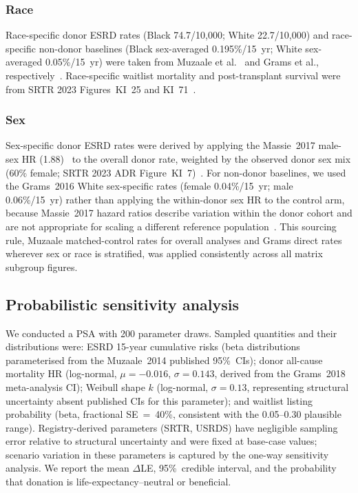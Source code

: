 \subsubsection{Race}
Race-specific donor ESRD rates (Black 74.7/10,000; White 22.7/10,000) and race-specific non-donor baselines (Black sex-averaged 0.195\%/15~yr; White sex-averaged 0.05\%/15~yr) were taken from Muzaale et al.\ \cite{muzaale_risk_2014} and Grams et al., respectively~\cite{grams_kidney-failure_2016}. Race-specific waitlist mortality and post-transplant survival were from SRTR 2023 Figures~KI~25 and KI~71~\cite{srtr_2023}.

\subsubsection{Sex}
Sex-specific donor ESRD rates were derived by applying the Massie~2017 male-sex HR (1.88)~\cite{massie_quantifying_2017} to the overall donor rate, weighted by the observed donor sex mix (60\% female; SRTR 2023 ADR Figure~KI~7)~\cite{srtr_2023}. For non-donor baselines, we used the Grams~2016 White sex-specific rates (female 0.04\%/15~yr; male 0.06\%/15~yr) rather than applying the within-donor sex HR to the control arm, because Massie~2017 hazard ratios describe variation within the donor cohort and are not appropriate for scaling a different reference population~\cite{grams_kidney-failure_2016}. This sourcing rule, Muzaale matched-control rates for overall analyses and Grams direct rates wherever sex or race is stratified, was applied consistently across all matrix subgroup figures.

\subsection{Probabilistic sensitivity analysis}
We conducted a PSA with 200 parameter draws. Sampled quantities and their distributions were: ESRD 15-year cumulative risks (beta distributions parameterised from the Muzaale~2014 published 95\%~CIs); donor all-cause mortality HR (log-normal, $\mu = {-0.016}$, $\sigma = 0.143$, derived from the Grams~2018 meta-analysis CI); Weibull shape $k$ (log-normal, $\sigma = 0.13$, representing structural uncertainty absent published CIs for this parameter); and waitlist listing probability (beta, fractional SE~=~40\%, consistent with the 0.05--0.30 plausible range). Registry-derived parameters (SRTR, USRDS) have negligible sampling error relative to structural uncertainty and were fixed at base-case values; scenario variation in these parameters is captured by the one-way sensitivity analysis. We report the mean $\Delta$LE, 95\%~credible interval, and the probability that donation is life-expectancy--neutral or beneficial.


